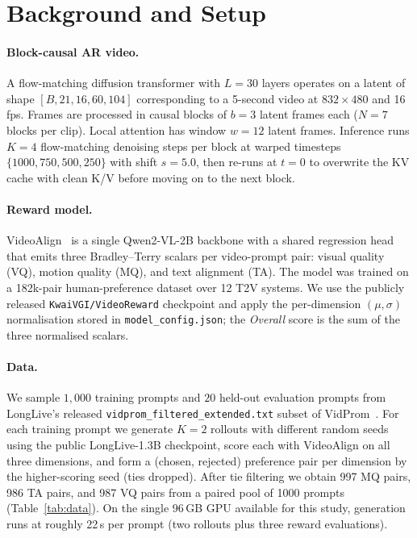 \documentclass{article}
\begin{document}
\section{Background and Setup}
\label{sec:bg}

\paragraph{Block-causal AR video.} A flow-matching diffusion transformer with $L=30$ layers operates on a latent of shape $[B, 21, 16, 60, 104]$ corresponding to a 5-second video at $832\!\times\!480$ and 16\,fps. Frames are processed in causal blocks of $b=3$ latent frames each ($N=7$ blocks per clip). Local attention has window $w=12$ latent frames. Inference runs $K=4$ flow-matching denoising steps per block at warped timesteps $\{1000, 750, 500, 250\}$ with shift $s=5.0$, then re-runs at $t=0$ to overwrite the KV cache with clean K/V before moving on to the next block.

\paragraph{Reward model.} VideoAlign~\cite{liu2025videoalign} is a single Qwen2-VL-2B backbone with a shared regression head that emits three Bradley--Terry scalars per video-prompt pair: visual quality (VQ), motion quality (MQ), and text alignment (TA). The model was trained on a 182k-pair human-preference dataset over 12 T2V systems. We use the publicly released \texttt{KwaiVGI/VideoReward} checkpoint and apply the per-dimension $(\mu,\sigma)$ normalisation stored in \texttt{model\_config.json}; the \emph{Overall} score is the sum of the three normalised scalars.

\paragraph{Data.} We sample $1{,}000$ training prompts and $20$ held-out evaluation prompts from LongLive's released \texttt{vidprom\_filtered\_extended.txt} subset of VidProm~\cite{wang2024vidprom}. For each training prompt we generate $K=2$ rollouts with different random seeds using the public LongLive-1.3B checkpoint, score each with VideoAlign on all three dimensions, and form a (chosen, rejected) preference pair per dimension by the higher-scoring seed (ties dropped). After tie filtering we obtain 997 MQ pairs, 986 TA pairs, and 987 VQ pairs from a paired pool of 1000 prompts (Table~\ref{tab:data}). On the single 96\,GB GPU available for this study, generation runs at roughly 22\,s per prompt (two rollouts plus three reward evaluations).
\end{document}
